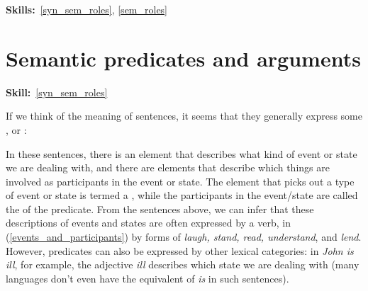 \documentclass{article}
\begin{document}
\maketitle
\subtitle{Topic 3 Course Notes: Predicates and Arguments Part 1\\
Syntactic and Semantic Arguments}
\hfill{}\textbf{Skills:}~\ref{syn_sem_roles},
\ref{sem_roles}


\section{Semantic predicates and arguments}
\hfill{}\textbf{Skill:}~\ref{syn_sem_roles}

If we think of the meaning of sentences, it seems that they generally express some , or :
\begin{exe}
     \label{events_and_participants}
\end{exe}
In these sentences, there is an element that describes what kind of event or state we are dealing with, and there are elements that describe which things are involved as participants in the event or state.
The element that picks out a type of event or state is termed a , while the participants in the event/state are called the  of the predicate.
From the sentences above, we can infer that these descriptions of events and states are often expressed by a verb, in (\ref{events_and_participants}) by forms of \emph{laugh, stand, read, understand}, and \emph{lend}. 
However, predicates can also be expressed by other lexical categories: in \emph{John is ill}, for example, the adjective \emph{ill} describes which state we are dealing with (many languages don't even have the equivalent of \emph{is} in such sentences).
\end{document}
